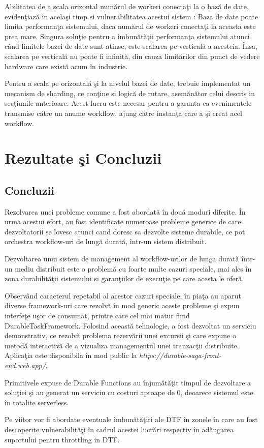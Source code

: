 \documentclass[a4paper,12pt]{report}
\begin{document}
\par Abilitatea de a scala orizontal numărul de workeri conectaţi la o bază de date, evidenţiază în acelaşi timp si vulnerabilitatea acestui sistem : Baza de date poate limita performanţa sistemului, daca numărul de workeri conectaţi la aceasta este prea mare. Singura soluţie pentru a imbunătăţii performanţa sistemului atunci când limitele bazei de date sunt atinse, este scalarea pe verticală a acesteia. Însa, scalarea pe verticală nu poate fi infinită, din cauza limitărilor din punct de vedere hardware care există acum în industrie. 
\par Pentru a scala pe orizontală şi la nivelul bazei de date, trebuie implementat un mecanism de sharding, ce conţine si logică de rutare, asemănător celui descris in secţiunile anterioare. Acest lucru este necesar pentru a garanta ca evenimentele transmise către un anume workflow, ajung către instanţa care a şi creat acel workflow. 
\chapter {Rezultate şi Concluzii}

\section{Concluzii}
\quad Rezolvarea unei probleme comune a fost abordată în două moduri diferite. În urma acestui efort, au fost identificate numeroase probleme generice de care dezvoltatorii se lovesc atunci cand doresc sa dezvolte sisteme durabile, ce pot orchestra workflow-uri de lungă durată, într-un sistem distribuit. 
\par Dezvoltarea unui sistem de management al workflow-urilor de lunga durată într-un mediu distribuit este o problemă cu foarte multe cazuri speciale, mai ales în zona durabilităţii sistemului si garanţiilor de execuţie pe care acesta le oferă. 
\par Observând caracterul repetabil al acestor cazuri speciale, în piaţa au aparut diverse framework-uri care rezolvă în mod generic aceste probleme şi expun interfeţe uşor de consumat, printre care cel mai matur fiind DurableTaskFramework. Folosind această tehnologie, a fost dezvoltat un serviciu demonstrativ, ce rezolvă problema rezervării unei excursii şi care expune o metodă interactivă de a vizualiza managementul unei tranzacţii distribuite. Aplicaţia este disponibila în mod public la \emph{https://durable-saga-front-end.web.app/}. 
\par Primitivele expuse de Durable Functions au înjumătăţit timpul de dezvoltare a soluţiei şi au generat un serviciu cu costuri aproape de 0, deoarece sistemul este în totalite serverless. 
\par Pe viitor vor fi abordate eventuale îmbunătăţiri ale DTF în zonele în care au fost descoperite vulnerabilităţi în cadrul acestei lucrări respectiv în adăugarea suportului pentru throttling in DTF.


\listoffigures

\end{document}

